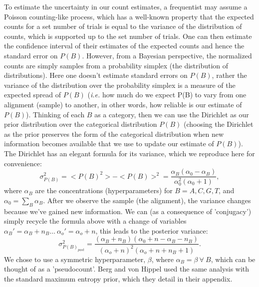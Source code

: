 To estimate the uncertainty in our count estimates, a frequentist may assume a Poisson counting-like process, which has a well-known property that the expected counts for a set number of trials is equal to the variance of the distribution of counts, which is supported up to the set number of trials.  One can then estimate the confidence interval of their estimates of the expected counts and hence the standard error on $P(B)$.  However, from a Bayesian perspective, the normalized counts are simply samples from a probability simplex (the distribution of distributions)\cite{bishop}.  Here one doesn't estimate standard errors on $P(B)$, rather the variance of the distribution over the probability simplex is a measure of the expected spread of $P(B)$ (\textit{i.e.} how much do we expect P(B) to vary from one alignment (sample) to another, in other words, how reliable is our estimate of $P(B)$).  Thinking of each $B$ as a category, then we can use the Dirichlet as our prior distribution over the categorical distribution $P(B)$ (choosing the Dirichlet as the prior preserves the form of the categorical distribution when new information becomes available that we use to update our estimate of $P(B)$).  The Dirichlet has an elegant formula for its variance, which we reproduce here for convenience:
\begin{equation}
\sigma_{P(B)}^2=<P(B)^2>-<P(B)>^2= \frac{\alpha_B (\alpha_0-\alpha_B)}{\alpha_0^2 (\alpha_0+1)},
\end{equation}
where $\alpha_B$ are the concentrations (hyperparameters) for $B=A,C,G,T$, and $\alpha_0=\sum_B \alpha_B$.
After we observe the sample (the alignment), the variance changes because we've gained new information.  We can (as a consequence of 'conjugacy') simply recycle the formula above with a change of variables $\alpha_B' = \alpha_B + n_B \dots \ \alpha_o'=\alpha_o + n $, this leads to the posterior variance:
\begin{equation}
\sigma_{P(B)_{post}}^2=\frac{(\alpha_B +n_B)(\alpha_0+n -\alpha_B-n_B)}{(\alpha_o+n)^2(\alpha_o+n+n_B + 1)}.
\end{equation}
 We chose to use a symmetric hyperparameter, $\beta$, where $\alpha_B = \beta  \ \forall \ B$, which can be thought of as a 'pseudocount'.  Berg and von Hippel used the same analysis with the standard maximum entropy prior, which they detail in their appendix\cite{pmid3612791}.  

